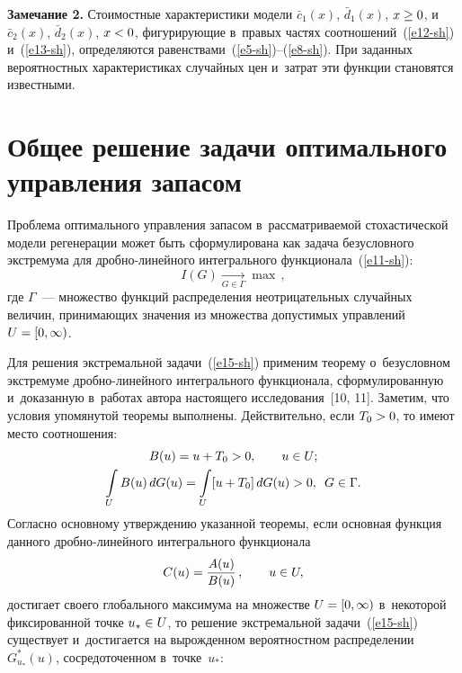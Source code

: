 \begin{multicols}{2}
\noindent
\textbf{Замечание 2.} Стоимостные характеристики модели $\bar{c}_1(x)$, 
$\bar{d}_1(x)$, $x\hm\geq0$, и~$\bar{c}_2(x)$, $\bar{d}_2(x)$, $x\hm<0$, фи\-гу\-ри\-ру\-ющие 
в~правых частях соотношений~(\ref{e12-sh}) и~(\ref{e13-sh}), определяются равенствами~(\ref{e5-sh})--(\ref{e8-sh}). При 
заданных вероятностных характеристиках случайных цен и~затрат эти функции 
становятся известными.

\vspace*{-6pt}

\section{Общее решение задачи оптимального управления
запасом}

\vspace*{-3pt}

Проблема оптимального управления запасом в~рассматриваемой стохастической модели 
регенерации может быть сформулирована как задача безусловного экстремума для 
дроб\-но-ли\-ней\-но\-го интегрального функционала~(\ref{e11-sh}):
\begin{equation}
    I(G)\underset{G\in\Gamma}{\rightarrow}\max\,,
    \label{e15-sh}
\end{equation}
где $\Gamma$~--- множество функций распределения неотрицательных случайных 
величин, принимающих значения из множества допустимых управлений $U \hm= [0, \infty)$.

Для решения экстремальной задачи~(\ref{e15-sh}) при\-меним теорему о~безуслов\-ном экстремуме 
дроб\-но-ли\-ней\-но\-го интегрального функционала, сформулированную и~доказанную 
в~работах автора \mbox{настоящего} исследования~[10, 11].
Заметим, что условия упо\-мя\-ну\-той тео\-ре\-мы выполнены. Действительно, если $T_0 \hm> 
0$, то име\-ют мес\-то соотношения:
\begin{gather*}
    B(u)=u+T_0>0,\qquad u\in U;\\
    \int\limits_U B(u)\,dG(u)=\int\limits_U[u+T_0]\,dG(u)>0,\enskip G\in\Gamma.
\end{gather*}
Согласно основному утверждению указанной тео\-ре\-мы, если основная функция данного 
дроб\-но-ли\-ней\-но\-го интегрального функционала
\begin{equation}
    C(u)=\displaystyle\frac{\displaystyle A(u)\mathstrut}{\displaystyle B(u)\mathstrut}\,,\qquad u\in U,\label{e16-sh}
\end{equation}
достигает своего глобального максимума на множестве $U\hm=[0, \infty)$ в~некоторой 
фиксированной точке $u_\ast\hm\in U$, то решение экстремальной задачи~(\ref{e15-sh}) 
существует и~достигается на вырожденном вероятностном распределении 
$G^\ast_{u_\ast}(u)$, сосредоточенном в~точке~$u_\ast$:


\end{multicols}
